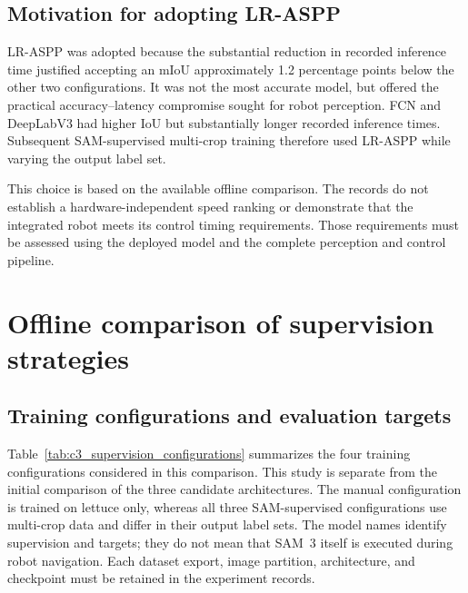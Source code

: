 \subsection{Motivation for adopting LR-ASPP}
\label{subsec:c3_lraspp_selection}

LR-ASPP was adopted because the substantial reduction in recorded
inference time justified accepting an mIoU approximately 1.2 percentage
points below the other two configurations. It was not the most accurate
model, but offered the practical accuracy--latency compromise sought for
robot perception. FCN and DeepLabV3 had higher IoU but substantially
longer recorded inference times. Subsequent SAM-supervised multi-crop
training therefore used LR-ASPP while varying the output label set.

This choice is based on the available offline comparison. The records
do not establish a hardware-independent speed ranking or demonstrate
that the integrated robot meets its control timing requirements.
Those requirements must be assessed using the deployed model and the
complete perception and control pipeline.

\section{Offline comparison of supervision strategies}
\label{sec:c3_supervision_comparison}

\subsection{Training configurations and evaluation targets}
\label{subsec:c3_supervision_configurations}

Table~\ref{tab:c3_supervision_configurations} summarizes the four training
configurations considered in this comparison. This study is separate
from the initial comparison of the three candidate architectures.
The manual configuration is trained on lettuce only, whereas all three
SAM-supervised configurations use multi-crop data and differ in their
output label sets. The model names identify supervision and targets;
they do not mean that SAM~3 itself is executed during robot navigation.
Each dataset export, image partition, architecture, and checkpoint must
be retained in the experiment records.

